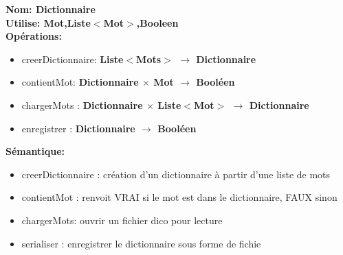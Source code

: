 \documentclass{article}
\begin{document}
    \noindent
    \textbf{Nom: Dictionnaire}\\
    \textbf{Utilise: Mot,Liste$<$Mot$>$,Booleen} \\
    \textbf{Opérations:} \begin{itemize}[label=$\ $, leftmargin=2cm, itemsep=0cm]
        \item creerDictionnaire: \textbf{Liste$<$Mots$>$ $\rightarrow $ Dictionnaire}
        \item contientMot: \textbf{Dictionnaire $\times$ Mot $\rightarrow $ Booléen}
        \item chargerMots : \textbf{Dictionnaire $\times$ Liste$<$Mot$>$ $ \rightarrow$ Dictionnaire}
        \item enregistrer : \textbf{Dictionnaire $\rightarrow$ Booléen}
        
    \end{itemize}
    
    \textbf{Sémantique: }\begin{itemize}[label=$\- $, leftmargin=2cm, itemsep=0cm]
        \item creerDictionnaire : création d’un dictionnaire à partir d’une liste de mots
        \item contientMot : renvoit VRAI si le mot est dans le dictionnaire, FAUX sinon
        \item chargerMots: ouvrir un fichier dico pour lecture
        \item serialiser : enregistrer le dictionnaire sous forme de fichie
    \end{itemize}
\end{document}
